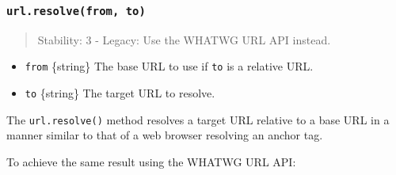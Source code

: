 \subsubsection{\texorpdfstring{\texttt{url.resolve(from,\ to)}}{url.resolve(from, to)}}\label{url.resolvefrom-to}

\begin{quote}
Stability: 3 - Legacy: Use the WHATWG URL API instead.
\end{quote}

\begin{itemize}
\tightlist
\item
  \texttt{from} \{string\} The base URL to use if \texttt{to} is a
  relative URL.
\item
  \texttt{to} \{string\} The target URL to resolve.
\end{itemize}

The \texttt{url.resolve()} method resolves a target URL relative to a
base URL in a manner similar to that of a web browser resolving an
anchor tag.

\begin{Shaded}
\begin{Highlighting}[]
\OperatorTok{=} \NormalTok{(}\NormalTok{)}\OperatorTok{;}
\NormalTok{(}\OperatorTok{,} \NormalTok{)}\OperatorTok{;}         
\NormalTok{(}\OperatorTok{,} \NormalTok{)}\OperatorTok{;}    
\NormalTok{(}\OperatorTok{,} \NormalTok{)}\OperatorTok{;} 
\end{Highlighting}
\end{Shaded}

To achieve the same result using the WHATWG URL API:

